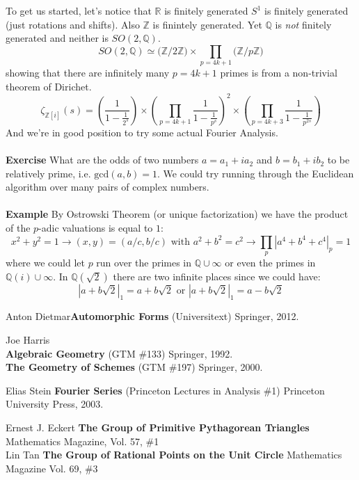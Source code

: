 \documentclass[12pt]{article}
\begin{document}
\newpage

\noindent To get us started, let's notice that $\mathbb{R}$ is finitely generated $S^1$ is finitely generated (just rotations and shifts).  Also $\mathbb{Z}$ is finintely generated. Yet $\mathbb{Q}$ is \textit{not} finitely generated and neither is $SO(2, \mathbb{Q})$. 
$$ SO(2, \mathbb{Q}) \simeq \big(\mathbb{Z}/2\mathbb{Z}\big)\times \prod_{p = 4k+1} \big(\mathbb{Z}/p\mathbb{Z}\big) $$
showing that there are infinitely many $p = 4k+1$ primes is from a non-trivial theorem of Dirichet.\\ 
$$  \zeta_{\mathbb{Z}[i]}(s) = \left( \frac{1}{1 - \frac{1}{2^s}}\right)
\times \left( \prod_{p = 4k+1} \frac{1}{1 - \frac{1}{p^s}}\right)^2
\times \left( \prod_{p = 4k+3} \frac{1}{1 - \frac{1}{p^{2s}}}\right)$$
And we're in good position to try some actual Fourier Analysis. \\ \\
\textbf{Exercise} What are the odds of two numbers $a = a_1 + i a_2$ and $b = b_1 + i b_2$ to be relatively prime, i.e. $\text{gcd}(a,b) = 1$.  We could try running through the Euclidean algorithm over many pairs of complex numbers. \\ \\
\textbf{Example} By Ostrowski Theorem (or unique factorization) we have the product of the $p$-adic valuations is equal to $1$:
$$ x^2 + y^2 = 1 \to (x,y) = (a/c,b/c) \text{ with } a^2 + b^2 = c^2 \to \prod_p |a^4 + b^4 + c^4 |_p = 1 $$
where we could let $p$ run over the primes in $\mathbb{Q} \cup \infty$ or even the primes in $\mathbb{Q}(i) \cup \infty$.  In $\mathbb{Q}(\sqrt{2})$ there are two infinite places since we could have:
$$ |a + b \sqrt{2}|_1 = a + b \sqrt{2} \text{ or } |a + b \sqrt{2}|_1 = a - b \sqrt{2}$$

\vfill
\begin{thebibliography}{}

\item Anton Dietmar\textbf{Automorphic Forms} (Universitext)  Springer, 2012.

\item Joe Harris \\ 
\textbf{Algebraic Geometry} \hspace{0.52in}(GTM \#133)  Springer, 1992. \\
\textbf{The Geometry of Schemes} (GTM \#197) Springer, 2000.

\item Elias Stein \textbf{Fourier Series} (Princeton Lectures in Analysis \#1) Princeton University Press, 2003.

\item Ernest J. Eckert \textbf{The Group of Primitive Pythagorean Triangles} Mathematics Magazine, Vol. 57, \#1  \\
Lin Tan \textbf{The Group of Rational Points on the Unit Circle}  Mathematics Magazine Vol. 69, \#3  


\end{thebibliography}
\end{document}
